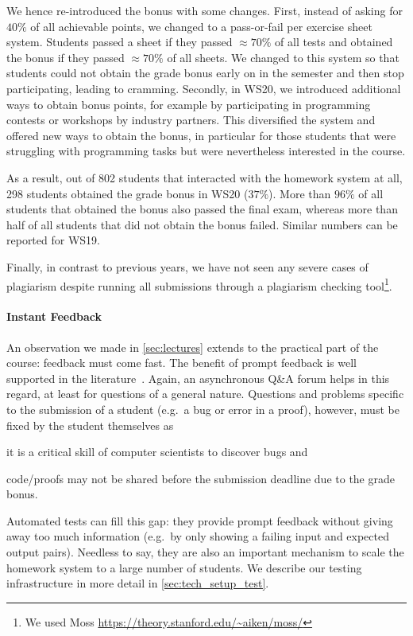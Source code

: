 We hence re-introduced the bonus with some changes.
First, instead of asking for $40\%$ of all achievable points,
we changed to a pass-or-fail per exercise sheet system.
Students passed a sheet if they
passed $\approx 70\%$ of all tests
and obtained the bonus if they passed $\approx 70\%$ of all sheets.
We changed to this system so that students
could not obtain the grade bonus early on in the semester and then stop participating,
leading to cramming.
Secondly, in WS20, we introduced additional ways to
obtain bonus points,
for example by participating in programming contests or workshops by industry partners.
This diversified the system and offered new ways
to obtain the bonus,
in particular for those students that were struggling
with programming tasks but were nevertheless interested in the course.

As a result, out of 802 students that interacted with the homework system at all, 298 students obtained the grade bonus in WS20 ($37\%$).
More than $96\%$ of all students that obtained the bonus
also passed the final exam,
whereas more than half of all students that did not obtain the bonus failed.
Similar numbers can be reported for WS19.

Finally, in contrast to previous years,
we have not seen any severe cases of plagiarism despite
running all submissions through a plagiarism checking tool\footnote{We used Moss \url{https://theory.stanford.edu/~aiken/moss/}}.

\paragraph{Instant Feedback}
An observation we made in \cref{sec:lectures}
extends to the practical part of the course:
feedback must come fast.
The benefit of prompt feedback is well supported in the literature~\cite{onlineengagement2,onlineengagement4}.
Again, an asynchronous Q\&A forum helps in this regard,
at least for questions of a general nature.
Questions and problems specific to the submission of a student (e.g.\ a bug or error in a proof),
however, must be fixed by the student themselves as
\begin{enumerate*}[label=\arabic*)]
  \item it is a critical skill of computer scientists to discover bugs and
  \item code/proofs may not be shared before the submission deadline due to the grade bonus.
\end{enumerate*}

Automated tests can fill this gap:
they provide prompt feedback without giving away too much information (e.g.\ by only showing a failing input and expected output pairs).
Needless to say, they are also an important mechanism
to scale the homework system to a large number of students.
We describe our testing infrastructure in more detail in \cref{sec:tech_setup_test}.

